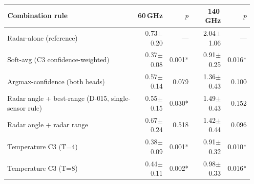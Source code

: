 \begin{tabular}{lrrrr}
\toprule
Combination rule & 60\,GHz & $p$ & 140\,GHz & $p$ \\
\midrule
Radar-alone (reference) & 0.73$\pm$0.20 & --- & 2.04$\pm$1.06 & --- \\
Soft-avg (C3 confidence-weighted) & 0.37$\pm$0.08 & 0.001* & 0.91$\pm$0.25 & 0.016* \\
Argmax-confidence (both heads) & 0.57$\pm$0.14 & 0.079 & 1.36$\pm$0.43 & 0.100 \\
Radar angle + best-range (D-015, single-sensor rule) & 0.55$\pm$0.15 & 0.030* & 1.49$\pm$0.43 & 0.152 \\
Radar angle + radar range & 0.67$\pm$0.24 & 0.518 & 1.42$\pm$0.44 & 0.096 \\
Temperature C3 (T=4) & 0.38$\pm$0.09 & 0.001* & 0.91$\pm$0.32 & 0.010* \\
Temperature C3 (T=8) & 0.44$\pm$0.11 & 0.002* & 0.98$\pm$0.33 & 0.016* \\
\bottomrule
\end{tabular}
